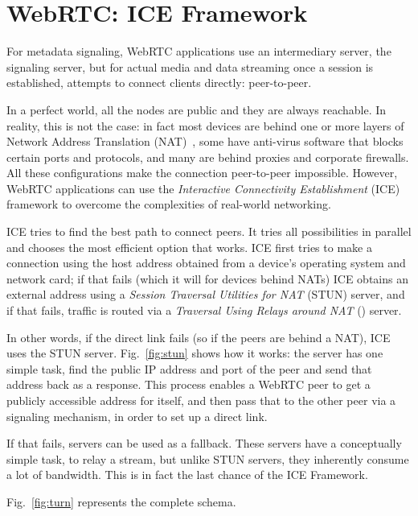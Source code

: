\section{WebRTC: ICE Framework}
\label{sec:webrtc_ice}
For metadata signaling, WebRTC applications use an intermediary server, the signaling server, but for actual media and data streaming once a session is established, \RTCPeerConnection attempts to connect clients directly: peer-to-peer. 

In a perfect world, all the nodes are public and they are always reachable. In reality, this is not the case: in fact most devices are behind one or more layers of Network Address Translation (NAT)~\cite{nat}, some have anti-virus software that blocks certain ports and protocols, and many are behind proxies and corporate firewalls. All these configurations make the connection peer-to-peer impossible. However, WebRTC applications can use the \textit{Interactive Connectivity Establishment} (ICE) framework to overcome the complexities of real-world networking. 

ICE tries to find the best path to connect peers. It tries all possibilities in parallel and chooses the most efficient option that works. ICE first tries to make a connection using the host address obtained from a device's operating system and network card; if that fails (which it will for devices behind NATs) ICE obtains an external address using a \textit{Session Traversal Utilities for NAT} (STUN) server, and if that fails, traffic is routed via a \textit{Traversal Using Relays around NAT} (\TURN) server\cite{webrtc_infrastructure}. 

In other words, if the direct link fails (so if the peers are behind a NAT), ICE uses the STUN server. Fig.~\ref{fig:stun} shows how it works: the server has one simple task, find the public IP address and port of the peer and send that address back as a response.  This process enables a WebRTC peer to get a publicly accessible address for itself, and then pass that to the other peer via a signaling mechanism, in order to set up a direct link.

If that fails, \TURN servers can be used as a fallback. These servers have a conceptually simple task, to relay a stream, but unlike STUN servers, they inherently consume a lot of bandwidth. This is in fact the last chance of the ICE Framework.

Fig.~\ref{fig:turn} represents the complete schema.

